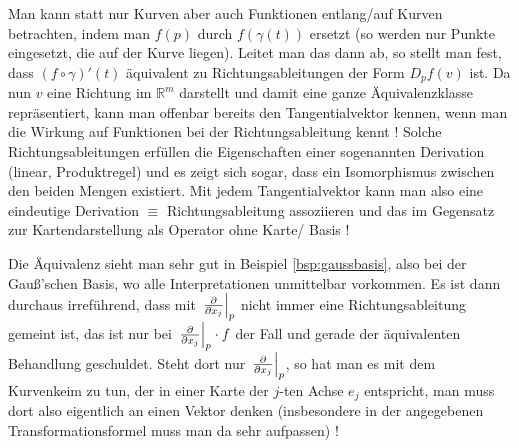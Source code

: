 \documentclass[../H_Analysis_main.tex]{subfiles}
\begin{document}
Man kann statt nur Kurven aber auch Funktionen entlang/auf Kurven betrachten, indem man $f(p)$ durch $f(\gamma(t))$ ersetzt (so werden nur Punkte eingesetzt, die auf der Kurve liegen). Leitet man das dann ab, so stellt man fest, dass $(f \circ \gamma)'(t)$ äquivalent zu Richtungsableitungen der Form $D_p f(v)$ ist. Da nun $v$ eine Richtung im $\mathbb{R}^m$ darstellt und damit eine ganze Äquivalenzklasse repräsentiert, kann man offenbar bereits den Tangentialvektor kennen, wenn man die Wirkung auf Funktionen bei der Richtungsableitung kennt ! Solche Richtungsableitungen erfüllen die Eigenschaften einer sogenannten Derivation (linear, Produktregel) und es zeigt sich sogar, dass ein Isomorphismus zwischen den beiden Mengen existiert. Mit jedem Tangentialvektor kann man also eine eindeutige Derivation $\equiv$ Richtungsableitung assoziieren und das im Gegensatz zur Kartendarstellung als Operator ohne Karte/ Basis !



Die Äquivalenz sieht man sehr gut in Beispiel \ref{bsp:gaussbasis}, also bei der Gauß'schen Basis, wo alle Interpretationen unmittelbar vorkommen. Es ist dann durchaus irreführend, dass mit $\eval{\pdv{x_j}}_p$ nicht immer eine Richtungsableitung gemeint ist, das ist nur bei $\eval{\pdv{x_j}}_p \cdot f$ der Fall und gerade der äquivalenten Behandlung geschuldet. Steht dort nur $\eval{\pdv{x_j}}_p$, so hat man es mit dem Kurvenkeim zu tun, der in einer Karte der $j$-ten Achse $e_j$ entspricht, man muss dort also eigentlich an einen Vektor denken (insbesondere in der angegebenen Transformationsformel muss man da sehr aufpassen) !\\





\end{document}
